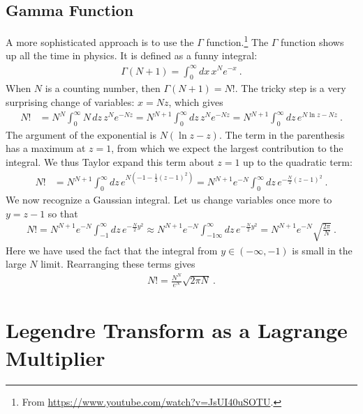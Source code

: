 \documentclass[
  11pt,
	colorful,
	raggedright,
]{tufte-style-thesis-flip}
\begin{document}
\subsection{Gamma Function}

A more sophisticated approach is to use the $\Gamma$ function.\footnote{From \url{https://www.youtube.com/watch?v=JsUI40uSOTU}.} The $\Gamma$ function shows up all the time in physics. It is defined as a funny integral:
\begin{align}
  \Gamma(N+1) = \int_0^\infty dx\, x^N e^{-x} \ .
\end{align}
When $N$ is a counting number, then $\Gamma(N+1)=N!$. The tricky step is a very surprising change of variables: $x=Nz$, which gives
\begin{align}
  N! &= N^N\int_0^\infty N\,dz\,z^N  e^{-Nz}
  = N^{N+1} \int_0^\infty dz\, z^N e^{-Nz} 
  = N^{N+1} \int_0^\infty dz\, e^{N\ln z-Nz} 
  \ .
\end{align}
The argument of the exponential is $N(\ln z - z)$.  The term in the parenthesis has a maximum at $z=1$, from which we expect the largest contribution to the integral. We thus Taylor expand this term about $z=1$ up to the quadratic term:
\begin{align}
  N! &= N^{N+1} 
  \int_0^\infty dz \,
  e^{N\left(
    -1 - \frac{1}{2}(z-1)^2
  \right)} 
  =
  N^{N+1} e^{-N}
  \int_0^\infty dz \,
  e^{- \frac{N}{2}(z-1)^2} 
    \ .
\end{align}
We now recognize a Gaussian integral. Let us change variables once more to $y=z-1$ so that
\begin{align}
  N! = 
  N^{N+1} e^{-N}
  \int_{-1}^\infty dz \,
  e^{- \frac{N}{2}y^2} 
  \approx 
  N^{N+1} e^{-N}
  \int_{-1\infty}^\infty dz \,
  e^{- \frac{N}{2}y^2} 
  =
  N^{N+1} e^{-N}\sqrt{\frac{2\pi}{N}} \ .
\end{align}
Here we have used the fact that the integral from $y\in (-\infty,-1)$ is small in the large $N$ limit. Rearranging these terms gives
\begin{align}
  N! = \frac{N^N}{e^N} \sqrt{2\pi N} \ .
\end{align}


\section{Legendre Transform as a Lagrange Multiplier}
\end{document}
